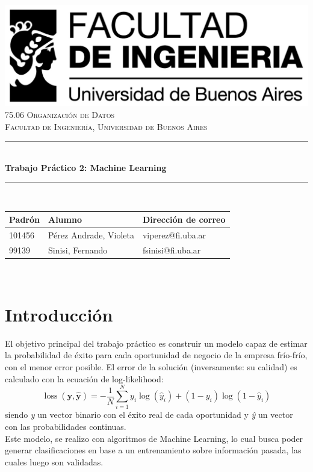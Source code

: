 \documentclass[12pt,a4paper]{article}
\newcommand{\thetitle}{Trabajo Práctico 2: Machine Learning}
\begin{document}
\begin{titlepage}
	\centering
    \vspace*{2.5cm}

    \includegraphics[scale = 0.7]{imgs/logofiuba.jpg}\\[2.0 cm]

	\textsc{\Large 75.06 Organización de Datos}\\[0.7 cm]
	\textsc{Facultad de Ingeniería, Universidad de Buenos Aires}\\[0.5 cm]

	\rule{0.94\linewidth}{0.2 mm} \\[0.4 cm]
	{\huge \bfseries \thetitle}\\
	\rule{0.94\linewidth}{0.2 mm} \\[1.2 cm]

    \begin{tabular}{lll} %
        \toprule
        Padrón & Alumno & Dirección de correo \\
        \midrule
        101456 & Pérez Andrade, Violeta  & viperez@fi.uba.ar \\
        99139 & Sinisi, Fernando & fsinisi@fi.uba.ar \\
        \bottomrule
    \end{tabular}\\


    \vspace*{1cm}

\end{titlepage}

\tableofcontents
\newpage

\section{Introducción}

El objetivo principal del trabajo práctico es construir un modelo capaz de estimar la probabilidad de éxito para cada oportunidad de negocio de la empresa frío-frío, con el menor error posible. El error de la solución (inversamente: su calidad) es calculado con la ecuación de log-likelihood:
\begin{equation}
\operatorname{loss}(\mathbf{y}, \hat{\mathbf{y}})=-\frac{1}{N} \sum_{i=1}^{N} y_{i} \log \left(\hat{y}_{i}\right)+\left(1-y_{i}\right) \log \left(1-\hat{y}_{i}\right)
\end{equation}
siendo \textit{y} un vector binario con el éxito real de cada oportunidad y \textit{ŷ} un vector con las probabilidades continuas. \\
Este modelo, se realizo con algoritmos de Machine Learning, lo cual busca poder generar clasificaciones en base a un entrenamiento sobre información pasada, las cuales luego son validadas.
\end{document}
